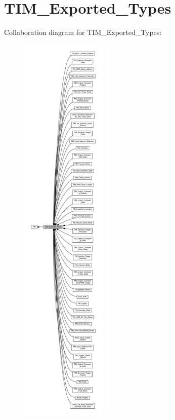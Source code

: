 \hypertarget{group___t_i_m___exported___types}{}\section{T\+I\+M\+\_\+\+Exported\+\_\+\+Types}
\label{group___t_i_m___exported___types}
Collaboration diagram for T\+I\+M\+\_\+\+Exported\+\_\+\+Types\+:
\nopagebreak
\begin{figure}[H]
\begin{center}
\leavevmode
\includegraphics[height=550pt]{group___t_i_m___exported___types}
\end{center}
\end{figure}

